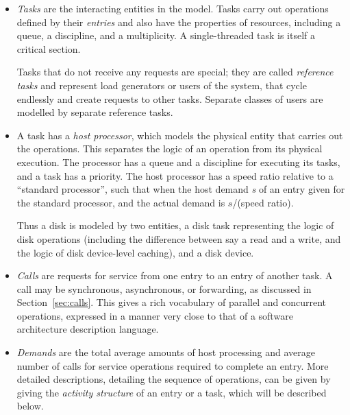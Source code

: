 \documentclass[11pt]{article}
\begin{document}
\begin{itemize}
\item \emph{Tasks} are the interacting entities in the model. Tasks carry out operations defined by their \emph{entries}
  and also have the properties of resources, including a queue, a discipline, and a multiplicity. A
  single-threaded task is itself a critical section.

  Tasks that do not receive any requests are special; they are called \emph{reference tasks} and represent
  load generators or users of the system, that cycle endlessly and create requests to other tasks. 
  Separate classes of users are modelled by separate reference tasks.
  
\item A task has a \emph{host processor}, which models the physical entity that carries out the operations. 
  This separates the logic of an operation from its physical execution. The processor has a queue
  and a discipline for executing its tasks, and a task has a priority. The host processor has a speed
  ratio relative to a ``standard processor'', such that when the host demand \emph{s} of an entry given for
  the standard processor, and the actual demand is $s$/(speed ratio).

  Thus a disk is modeled by two entities, a disk task representing the logic of disk operations
  (including the difference between say a read and a write, and the logic of disk device-level
  caching), and a disk device. 

\item \emph{Calls} are requests for service from one entry to an entry of another task. A call may be 
  synchronous, asynchronous, or forwarding, as discussed in Section~\ref{sec:calls}. This gives a rich 
  vocabulary of parallel and concurrent operations, expressed in a manner very close to that of a 
  software architecture description language. 

\item \emph{Demands} are the total average amounts of host processing and average number of calls for 
  service operations required to complete an entry. More detailed descriptions, detailing the 
  sequence of operations, can be given by giving the \emph{activity structure} of an entry or a
  task, which will be described below.  
\end{itemize}
\end{document}
